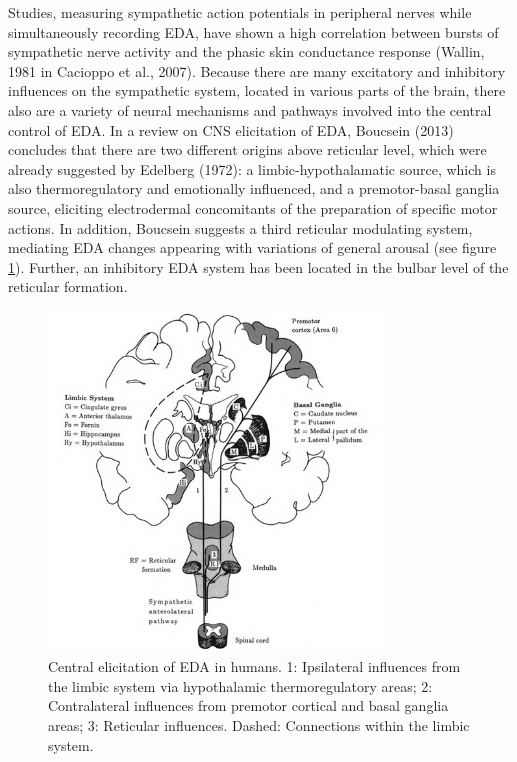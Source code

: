 Studies, measuring sympathetic action potentials in peripheral nerves while simultaneously recording EDA, have shown a high correlation between bursts of sympathetic nerve activity and the phasic skin conductance response (Wallin, 1981 in Cacioppo et al., 2007). Because there are many excitatory and inhibitory influences on the sympathetic system, located in various parts of the brain, there also are a variety of neural mechanisms and pathways involved into the central control of EDA.
In a review on CNS elicitation of EDA, Boucsein (2013) concludes that there are two different origins above reticular level, which were already suggested by Edelberg (1972): a limbic-hypothalamatic source, which is also thermoregulatory and emotionally influenced, and a premotor-basal ganglia source, eliciting electrodermal concomitants of the preparation of specific motor actions. In addition, Boucsein suggests a third reticular modulating system, mediating EDA changes appearing with variations of general arousal (see figure \ref{znsImg}). Further, an inhibitory EDA system has been located in the bulbar level of the reticular formation.

\begin{figure}[ht]
\centering
\includegraphics[width=0.8\textwidth]{images/zns.png}
\caption{Central elicitation of EDA in humans. 1: Ipsilateral influences from the limbic system via hypothalamic thermoregulatory areas; 2: Contralateral influences from premotor cortical and basal ganglia areas; 3: Reticular influences. Dashed: Connections within the limbic system.\citep{boucsein2013electrodermal}}
\label{znsImg}
\end{figure}

